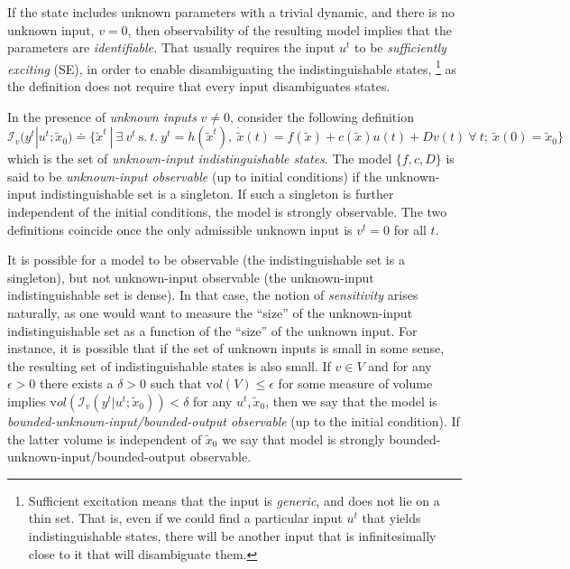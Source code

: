 If the state includes unknown parameters with a trivial dynamic, and there is no unknown input, $v = 0$, then observability of the resulting model implies that the parameters are {\em identifiable.} That usually requires the input $u^t$ to be {\em sufficiently exciting} (SE), in order to enable disambiguating the indistinguishable states,
\footnote{Sufficient excitation means that the input is {\em generic}, and does not lie on a thin set. That is, even if we could find a particular input $u^t$ that yields indistinguishable states, there will be another input that is infinitesimally close to it that will disambiguate them.} as the definition does not require that every input disambiguates states.

In the presence of {\em unknown inputs} $v \neq 0$, consider the following definition
\begin{equation}
{\mathcal I}_v(y^t | u^t; \tilde x_0) \doteq \{ {\tilde x}^t \ | \ \exists \ v^t \ {\mathrm s. \ t. } \ y^t = h(\tilde x^t), \ \dot {\tilde x}(t) = f({\tilde x}) + c({\tilde x}) u(t) + D v(t) \ \forall \ t; \ \tilde x(0) = \tilde x_0\}
\end{equation}
which is the set of {\em unknown-input indistinguishable states}. The model $\{f, c, D\}$ is said to be {\em unknown-input observable} (up to initial conditions) if the unknown-input indistinguishable set is a singleton. If such a singleton is further independent of the initial conditions, the model is strongly observable. The two definitions coincide once the only admissible unknown input is $v^t = 0$ for all $t$.

It is possible for a model to be observable (the indistinguishable set is a singleton), but not unknown-input observable (the unknown-input indistinguishable set is dense). In that case, the notion of {\em sensitivity} arises naturally, as one would want to measure the ``size'' of the unknown-input indistinguishable set as a function of the ``size'' of the unknown input. For instance, it is possible that if the set of unknown inputs is small in some sense, the resulting set of indistinguishable states is also small. If $v \in V$ and for any $\epsilon>0$ there exists a $\delta >0$ such that ${\mathrm vol}(V) \le \epsilon$ for some measure of volume implies ${\mathrm vol}({\mathcal I}_v(y^t | u^t; \tilde x_0)) < \delta$ for any $u^t, \tilde x_0$, then we say that the model is {\em bounded-unknown-input/bounded-output observable} (up to the initial condition). If the latter volume is independent of $\tilde x_0$ we say that model is strongly bounded-unknown-input/bounded-output observable.


